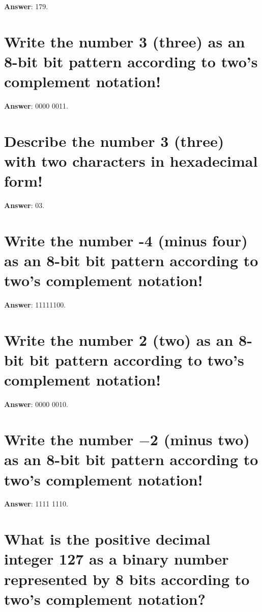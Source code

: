 \documentclass[a4paper,11pt,oneside]{book}
\begin{document}
\begin{sloppypar}
\label{q:365:sa:en:True}

\textbf{Answer}: 179.



\section{Write the number 3 (three) as an 8-bit bit pattern according to two's complement notation!}

\label{q:366:sa:en:True}

\textbf{Answer}: 0000 0011.



\section{Describe the number 3 (three) with two characters in hexadecimal form!}

\label{q:367:sa:en:True}

\textbf{Answer}: 03.



\section{Write the number -4 (minus four) as an 8-bit bit pattern according to two's complement notation!}

\label{q:368:sa:en:True}

\textbf{Answer}: 11111100.



\section{Write the number 2 (two) as an 8-bit bit pattern according to two's complement notation!}

\label{q:369:sa:en:True}

\textbf{Answer}: 0000 0010.



\section{Write the number \ensuremath{-}2 (minus two) as an 8-bit bit pattern according to two's complement notation!}

\label{q:370:sa:en:True}

\textbf{Answer}: 1111 1110.



\section{What is the positive decimal integer 127 as a binary number represented by 8 bits according to two's complement notation?}


\end{sloppypar}
\end{document}
